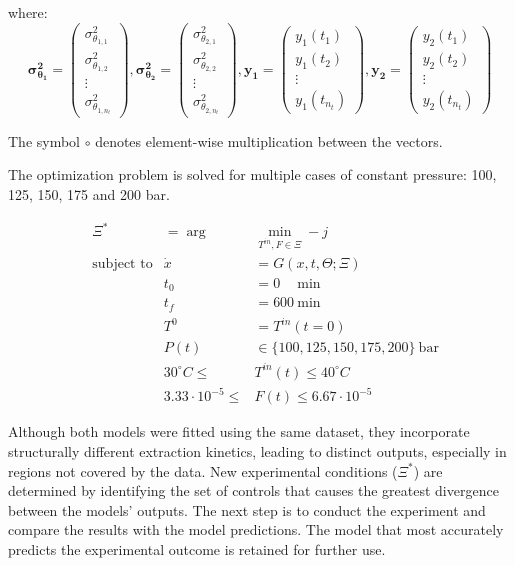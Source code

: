 \documentclass[../Article_Design_of_Experiment.tex]{subfiles}
\begin{document}
	where: 
	{\footnotesize
		\begin{equation*}
		 \boldsymbol{\sigma_{\theta_1}^2} = \begin{pmatrix} \sigma_{\theta_{1,1}}^2 \\ \sigma_{\theta_{1,2}}^2 \\ \vdots \\ \sigma_{\theta_{1,n_t}}^2 \end{pmatrix}, \boldsymbol{\sigma_{\theta_2}^2} = \begin{pmatrix} \sigma_{\theta_{2,1}}^2 \\ \sigma_{\theta_{2,2}}^2 \\ \vdots \\ \sigma_{\theta_{2,n_t}}^2 \end{pmatrix}, \mathbf{y_1} = \begin{pmatrix} y_1(t_1) \\ y_1(t_2) \\ \vdots \\ y_1(t_{n_t}) \end{pmatrix},  \mathbf{y_2} = \begin{pmatrix} y_2(t_1) \\ y_2(t_2) \\ \vdots \\ y_2(t_{n_t}) \end{pmatrix} 
	\end{equation*} }
			
	The symbol \( \circ \) denotes element-wise multiplication between the vectors.
	
	The optimization problem is solved for multiple cases of constant pressure: 100, 125, 150, 175 and 200 bar.
	
		{\footnotesize
		\begin{equation}
			\begin{aligned} 
				&\Xi^* &= \arg &\min_{ T^{in}, F \in \Xi} -j  \\
				&\text{subject to}
				& \dot{x} &= G(x,t,\Theta;\Xi) \\
				&& t_0&=0\quad~\text{min} \\
				&& t_f&=600~\text{min} \\
				&& T^{0} &= T^{in}(t=0) \\
				&& P(t) & \in \{100, 125, 150, 175, 200\}~\text{bar} \\
				&& 30^\circ C \leq &T^{in}(t) \leq 40^\circ C \\
				&& 3.33 \cdot 10^{-5} \leq &F(t) \leq 6.67 \cdot 10^{-5}
			\end{aligned} \label{EQ:Formulation}
	\end{equation} }
	
	Although both models were fitted using the same dataset, they incorporate structurally different extraction kinetics, leading to distinct outputs, especially in regions not covered by the data. New experimental conditions ($\Xi^*$) are determined by identifying the set of controls that causes the greatest divergence between the models’ outputs. The next step is to conduct the experiment and compare the results with the model predictions. The model that most accurately predicts the experimental outcome is retained for further use. 
\end{document}
